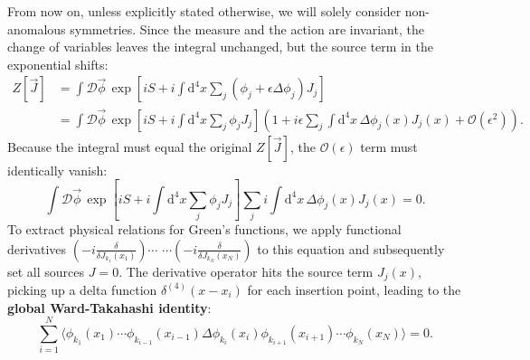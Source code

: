 From now on, unless explicitly stated otherwise, we will solely consider non-anomalous symmetries. Since the measure and the action are invariant, the change of variables leaves the integral unchanged, but the source term in the exponential shifts:
\[
    \begin{aligned}
        Z[\vec{J}] & = \int \mathcal{D}\vec{\phi} \, \exp\left[ iS + i \int \mathrm{d}^4x \sum_j (\phi_j + \epsilon \Delta\phi_j) J_j \right]                                                                                   \\
                   & = \int \mathcal{D}\vec{\phi} \, \exp\left[ iS + i \int \mathrm{d}^4x \sum_j \phi_j J_j \right] \left( 1 + i\epsilon \sum_j \int \mathrm{d}^4x \, \Delta\phi_j(x) J_j(x) + \mathcal{O}(\epsilon^2) \right).
    \end{aligned}
\]
Because the integral must equal the original $Z[\vec{J}]$, the $\mathcal{O}(\epsilon)$ term must identically vanish:
\[
    \int \mathcal{D}\vec{\phi} \, \exp\left[ iS + i \int \mathrm{d}^4x \sum_j \phi_j J_j \right] \sum_j i \int \mathrm{d}^4x \, \Delta\phi_j(x) J_j(x) = 0.
\]
To extract physical relations for Green's functions, we apply functional derivatives $\left(-i \frac{\delta}{\delta J_{k_1}(x_1)}\right) \cdots$ $\cdots\left(-i \frac{\delta}{\delta J_{k_N}(x_N)}\right)$ to this equation and subsequently set all sources $J=0$. The derivative operator hits the source term $J_j(x)$, picking up a delta function $\delta^{(4)}(x - x_i)$ for each insertion point, leading to the \textbf{global Ward-Takahashi identity}:
\[
    \sum_{i=1}^N \langle \phi_{k_1}(x_1) \cdots \phi_{k_{i-1}}(x_{i-1}) \Delta\phi_{k_i}(x_i) \phi_{k_{i+1}}(x_{i+1}) \cdots \phi_{k_N}(x_N) \rangle = 0.
\]


